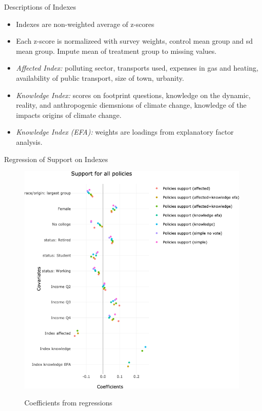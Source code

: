 \documentclass[aspectratio=169,9pt,dvipsnames]{beamer}
\begin{document}
\begin{frame}{Descriptions of Indexes}
\begin{itemize}
  \item Indexes are non-weighted average of z-scores
  \item Each z-score is normalizeed with survey weights, control mean group and sd mean group. Impute mean of treatment group to missing values.
  \item \textit{Affected Index:} polluting sector, transports used, expenses in gas and heating, availability of public transport, size of town, urbanity.
  \item \textit{Knowledge Index:} scores on footprint questions, knowledge on the dynamic, reality, and anthropogenic diemsnions of climate change, knowledge of the impacts origins of climate change.
  \item \textit{Knowledge Index (EFA):} weights are loadings from explanatory factor analysis.
\end{itemize}
\end{frame}

\begin{frame}{Regression of Support on Indexes}%
\vspace{-.5cm}
\begin{figure}[h!]
\caption{Coefficients from regressions}
\includegraphics[width=.5\textwidth]{../figures/DK/coef_support_indexes_DK.png} \\
\end{figure}
\end{frame}
\end{document}
